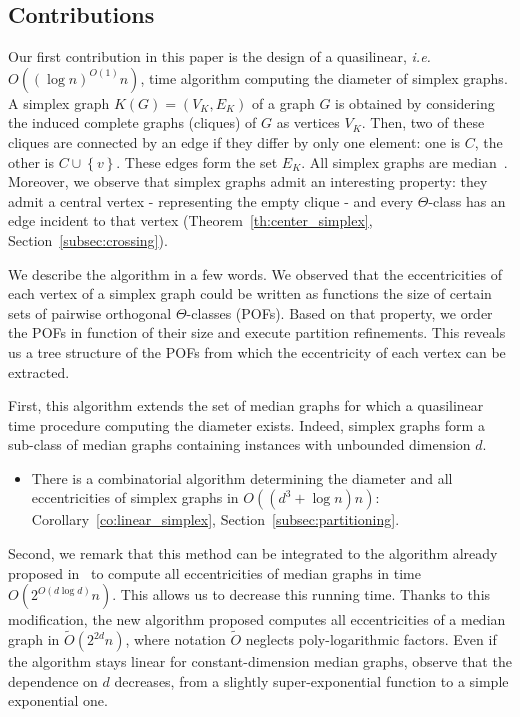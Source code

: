 \documentclass{article}
\newcommand{\set}[1]{\left\{ #1 \right\}}
\begin{document}
\subsection{Contributions}

Our first contribution in this paper is the design of a quasilinear, {\em i.e.} $O((\log n)^{O(1)}n)$, time algorithm computing the diameter of simplex graphs. A simplex graph $K(G) = (V_K,E_K)$ of a graph $G$ is obtained by considering the induced complete graphs (cliques) of $G$ as vertices $V_K$. Then, two of these cliques are connected by an edge if they differ by only one element: one is $C$, the other is $C \cup \set{v}$. These edges form the set $E_K$. All simplex graphs are median~\cite{BaCh08,BaLeMo86}. Moreover, we observe that simplex graphs admit an interesting property: they admit a central vertex - representing the empty clique - and every $\Theta$-class has an edge incident to that vertex (Theorem~\ref{th:center_simplex}, Section~\ref{subsec:crossing}).

We describe the algorithm in a few words. We observed that the eccentricities of each vertex of a simplex graph could be written as functions the size of certain sets of pairwise orthogonal $\Theta$-classes (POFs). Based on that property, we order the POFs in function of their size and execute partition refinements. This reveals us a tree structure of the POFs from which the eccentricity of each vertex can be extracted. 

First, this algorithm extends the set of median graphs for which a quasilinear time procedure computing the diameter exists. Indeed, simplex graphs form a sub-class of median graphs containing instances with unbounded dimension $d$.

\begin{itemize}
    \item There is a combinatorial algorithm determining the diameter and all eccentricities of simplex graphs in $O((d^3+\log n)n)$: Corollary~\ref{co:linear_simplex}, Section~\ref{subsec:partitioning}.
\end{itemize}

Second, we remark that this method can be integrated to the algorithm already proposed in~\cite{BeHa21} to compute all eccentricities of median graphs in time $O(2^{O(d\log d)}n)$. This allows us to decrease this running time. Thanks to this modification, the new algorithm proposed computes all eccentricities of a median graph in $\tilde{O}(2^{2d}n)$, where notation $\tilde{O}$ neglects poly-logarithmic factors. Even if the algorithm stays linear for constant-dimension median graphs, observe that the dependence on $d$ decreases, from a slightly super-exponential function to a simple exponential one.
\end{document}

